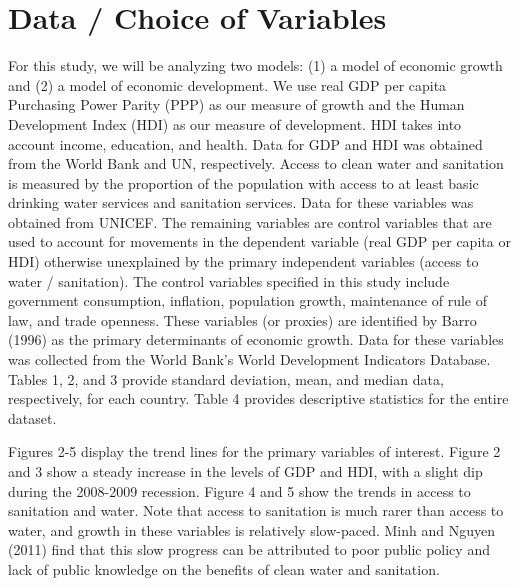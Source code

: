 \documentclass{article}
\begin{document}
\section{Data / Choice of Variables}
For this study, we will be analyzing two models: (1) a model of economic growth and (2) a model of economic development. We use real GDP per capita Purchasing Power Parity (PPP) as our measure of growth and the Human Development Index (HDI) as our measure of development. HDI takes into account income, education, and health. Data for GDP and HDI was obtained from the World Bank and UN, respectively. Access to clean water and sanitation is measured by the proportion of the population with access to at least basic drinking water services and sanitation services. Data for these variables was obtained from UNICEF. The remaining variables are control variables that are used to account for movements in the dependent variable (real GDP per capita or HDI) otherwise unexplained by the primary independent variables (access to water / sanitation). The control variables specified in this study include government consumption, inflation, population growth, maintenance of rule of law, and trade openness. These variables (or proxies) are identified by Barro (1996) as the primary determinants of economic growth. Data for these variables was collected from the World Bank’s World Development Indicators Database. Tables 1, 2, and 3 provide standard deviation, mean, and median data, respectively, for each country. Table 4 provides descriptive statistics for the entire dataset. 

Figures 2-5 display the trend lines for the primary variables of interest. Figure 2 and 3 show a steady increase in the levels of GDP and HDI, with a slight dip during the 2008-2009 recession. Figure 4 and 5 show the trends in access to sanitation and water. Note that access to sanitation is much rarer than access to water, and growth in these variables is relatively slow-paced. Minh and Nguyen (2011) find that this slow progress can be attributed to poor public policy and lack of public knowledge on the benefits of clean water and sanitation. 
\end{document}
